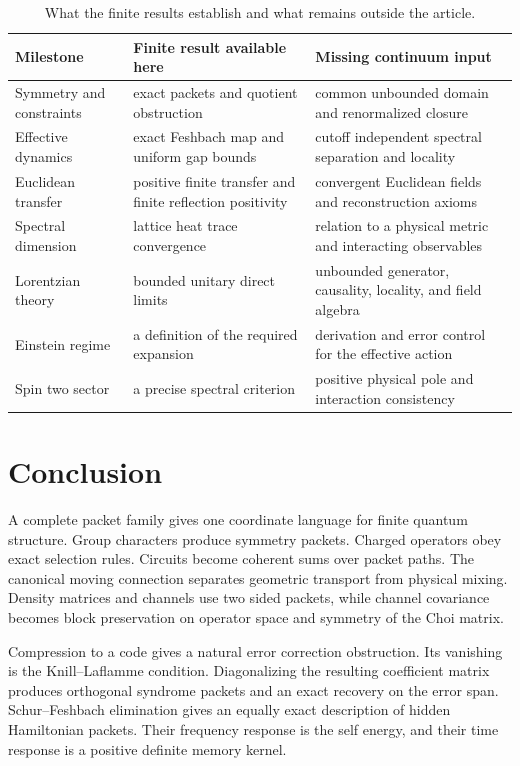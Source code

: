 \begin{table}[t]
\centering
\small
\begin{tabular}{>{\raggedright\arraybackslash}p{}>{\raggedright\arraybackslash}p{}>{\raggedright\arraybackslash}p{}}
\toprule
Milestone & Finite result available here & Missing continuum input \\
\midrule
Symmetry and constraints & exact packets and quotient obstruction & common unbounded domain and renormalized closure \\
Effective dynamics & exact Feshbach map and uniform gap bounds & cutoff independent spectral separation and locality \\
Euclidean transfer & positive finite transfer and finite reflection positivity & convergent Euclidean fields and reconstruction axioms \\
Spectral dimension & lattice heat trace convergence & relation to a physical metric and interacting observables \\
Lorentzian theory & bounded unitary direct limits & unbounded generator, causality, locality, and field algebra \\
Einstein regime & a definition of the required expansion & derivation and error control for the effective action \\
Spin two sector & a precise spectral criterion & positive physical pole and interaction consistency \\
\bottomrule
\end{tabular}
\caption{What the finite results establish and what remains outside the article.}
\label{strong:tab:continuum_milestones}
\end{table}

\section{Conclusion}\label{strong:section:015}\label{strong:sec:conclusion}

A complete packet family gives one coordinate language for finite quantum structure. Group characters produce symmetry packets. Charged operators obey exact selection rules. Circuits become coherent sums over packet paths. The canonical moving connection separates geometric transport from physical mixing. Density matrices and channels use two sided packets, while channel covariance becomes block preservation on operator space and symmetry of the Choi matrix.

Compression to a code gives a natural error correction obstruction. Its vanishing is the Knill--Laflamme condition. Diagonalizing the resulting coefficient matrix produces orthogonal syndrome packets and an exact recovery on the error span. Schur--Feshbach elimination gives an equally exact description of hidden Hamiltonian packets. Their frequency response is the self energy, and their time response is a positive definite memory kernel.


